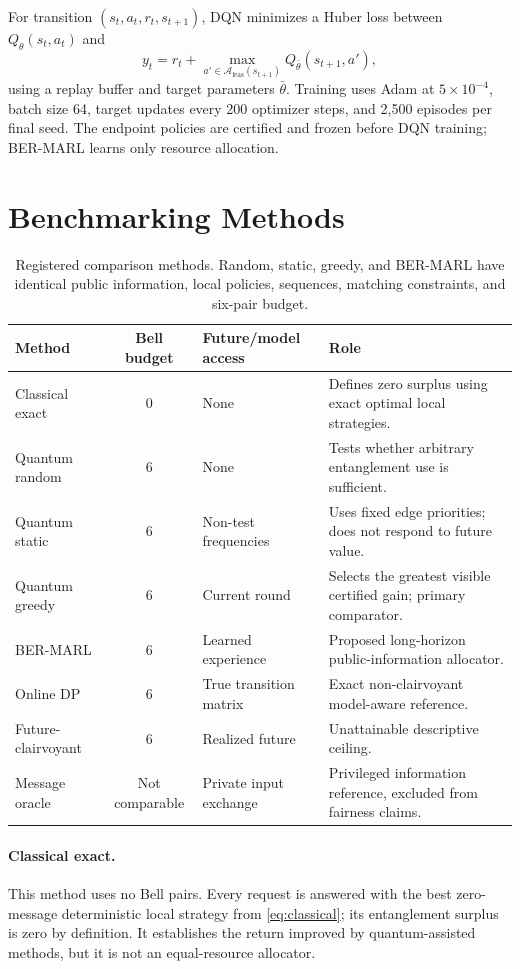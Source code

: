 \documentclass[10pt,twocolumn]{article}
\newcommand{\method}{\textsc{BER-MARL}}
\begin{document}
For transition $(s_t,a_t,r_t,s_{t+1})$, DQN minimizes a Huber loss between $Q_\theta(s_t,a_t)$ and
\begin{equation}
 y_t=r_t+\max_{a'\in\mathcal{A}_{\mathrm{feas}}(s_{t+1})}Q_{\bar\theta}(s_{t+1},a'),
\end{equation}
using a replay buffer and target parameters $\bar\theta$. Training uses Adam at $5\times10^{-4}$, batch size 64, target updates every 200 optimizer steps, and 2,500 episodes per final seed. The endpoint policies are certified and frozen before DQN training; \method{} learns only resource allocation.

\section{Benchmarking Methods}
\begin{table}[t]
\centering
\caption{Registered comparison methods. Random, static, greedy, and \method{} have identical public information, local policies, sequences, matching constraints, and six-pair budget.}
\label{tab:methods}
\small
\begin{tabular}{@{}lclp{8.6cm}@{}}
\toprule
Method & Bell budget & Future/model access & Role \\
\midrule
Classical exact & 0 & None & Defines zero surplus using exact optimal local strategies. \\
Quantum random & 6 & None & Tests whether arbitrary entanglement use is sufficient. \\
Quantum static & 6 & Non-test frequencies & Uses fixed edge priorities; does not respond to future value. \\
Quantum greedy & 6 & Current round & Selects the greatest visible certified gain; primary comparator. \\
\method{} & 6 & Learned experience & Proposed long-horizon public-information allocator. \\
Online DP & 6 & True transition matrix & Exact non-clairvoyant model-aware reference. \\
Future-clairvoyant & 6 & Realized future & Unattainable descriptive ceiling. \\
Message oracle & Not comparable & Private input exchange & Privileged information reference, excluded from fairness claims. \\
\bottomrule
\end{tabular}
\end{table}

\paragraph{Classical exact.}
This method uses no Bell pairs. Every request is answered with the best zero-message deterministic local strategy from \cref{eq:classical}; its entanglement surplus is zero by definition. It establishes the return improved by quantum-assisted methods, but it is not an equal-resource allocator.
\end{document}
